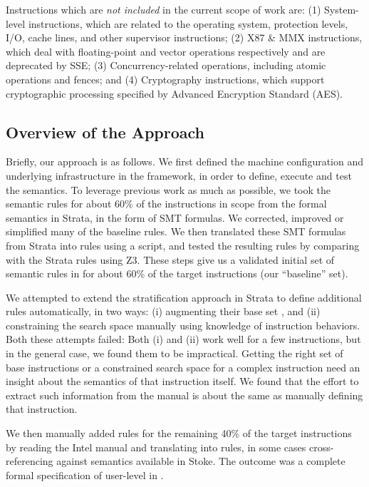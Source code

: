 Instructions which are \emph{not included} in the current scope of work are: 
(1) System-level instructions, which are related to the operating system, 
protection levels, I/O, cache lines, and other supervisor instructions; 
(2) X87 \& MMX instructions, which deal with floating-point and vector 
operations respectively and are deprecated by SSE; 
(3) Concurrency-related operations, including atomic operations and fences; and 
(4) Cryptography instructions, which support cryptographic processing specified by Advanced Encryption Standard (AES).

\subsection{Overview of the Approach}
\label{sec:Approach:Overview}

Briefly, our approach is as follows.
%
We first defined the machine configuration and underlying infrastructure in the \K framework, in order to define, execute and test the \ISA semantics.
%
To leverage previous work as much as possible, we took the semantic rules for about 60\% of the instructions in scope from the formal semantics in Strata, in the form of SMT formulas.
%
We corrected, improved or simplified many of the baseline rules.
%
We then translated these SMT formulas from Strata into \K rules using a script, and tested the resulting rules by comparing with the Strata rules using Z3.
%
These steps give us a validated initial set of semantic rules in \K for about 60\% of the target instructions (our ``baseline'' set).

We attempted to extend the stratification approach in Strata to define additional rules automatically, in two ways: (i) augmenting their base set , and (ii) constraining the search space manually using knowledge of instruction behaviors.  Both these attempts failed: Both (i) and (ii) work well for a few instructions, but in the general case, we found them to be impractical.  Getting the right set of base instructions or a constrained search space for a complex instruction need an insight about the semantics of that instruction itself. We found that the effort to extract such information from the manual is about the same  as manually defining that instruction.


We then manually added \K rules for the remaining 40\% of the target instructions by reading the Intel manual and translating into \K rules, in some cases cross-referencing against semantics available in Stoke.
%
The outcome was a complete formal specification of user-level \ISA in \K.

